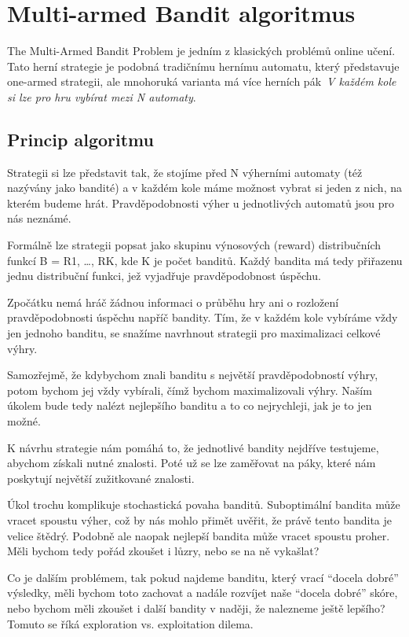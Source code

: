 \documentclass[thesis=M,czech]{FITthesis}[2014/05/07]
\begin{document}
\section{Multi-armed Bandit algoritmus}
The Multi-Armed Bandit Problem je jedním z klasických problémů online učení. Tato herní strategie je podobná tradičnímu hernímu automatu, který představuje one-armed strategii, ale mnohoruká varianta má více herních pák~\emph{V každém kole si lze pro hru vybírat mezi N automaty}. 

\subsection{Princip algoritmu}
Strategii si lze představit tak, že stojíme před N výherními automaty (též nazývány jako bandité) a v každém kole máme možnost vybrat si jeden z nich, na kterém budeme hrát. Pravděpodobnosti výher u jednotlivých automatů jsou pro nás neznámé. 

Formálně lze strategii popsat jako skupinu výnosových (reward) distribučních funkcí B = {R1, …, RK}, kde K je počet banditů. Každý bandita má tedy přiřazenu jednu distribuční funkci, jež vyjadřuje pravděpodobnost úspěchu. 

Zpočátku nemá hráč žádnou informaci o průběhu hry ani o rozložení pravděpodobnosti úspěchu napříč bandity. Tím, že v každém kole vybíráme vždy jen jednoho banditu, se snažíme navrhnout strategii pro maximalizaci celkové výhry.

Samozřejmě, že kdybychom znali banditu s největší pravděpodobností výhry, potom bychom jej vždy vybírali, čímž bychom maximalizovali výhry. Naším úkolem bude tedy nalézt nejlepšího banditu a to co nejrychleji, jak je to jen možné.

K návrhu strategie nám pomáhá to, že jednotlivé bandity nejdříve testujeme, abychom získali nutné znalosti. Poté už se lze zaměřovat na páky, které nám poskytují největší zužitkované znalosti. 

Úkol trochu komplikuje stochastická povaha banditů. Suboptimální bandita může vracet spoustu výher, což by nás mohlo přimět uvěřit, že právě tento bandita je velice štědrý. Podobně ale naopak nejlepší bandita může vracet spoustu proher. Měli bychom tedy pořád zkoušet i lůzry, nebo se na ně vykašlat?

Co je dalším problémem, tak pokud najdeme banditu, který vrací “docela dobré” výsledky, měli bychom toto zachovat a nadále rozvíjet naše “docela dobré” skóre, nebo bychom měli zkoušet i další bandity v naději, že nalezneme ještě lepšího? Tomuto se říká exploration vs. exploitation dilema.
\end{document}
